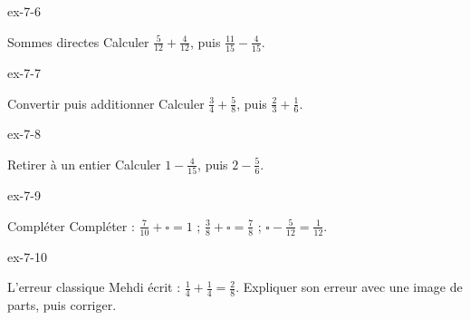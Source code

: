 \begin{blocLivre}{ex-7-6}\begin{exercice}[2]{Sommes directes}
Calculer $\frac5{12}+\frac4{12}$, puis $\frac{11}{15}-\frac4{15}$.
\end{exercice}\end{blocLivre}
\begin{blocLivre}{ex-7-7}\begin{exercice}[2]{Convertir puis additionner}
Calculer $\frac34+\frac58$, puis $\frac23+\frac16$.
\end{exercice}\end{blocLivre}
\begin{blocLivre}{ex-7-8}\begin{exercice}[2]{Retirer à un entier}
Calculer $1-\frac4{15}$, puis $2-\frac56$.
\end{exercice}\end{blocLivre}
\begin{blocLivre}{ex-7-9}\begin{exercice}[2]{Compléter}
Compléter : $\frac7{10}+\square=1$ ; $\frac38+\square=\frac78$ ; $\square-\frac5{12}=\frac1{12}$.
\end{exercice}\end{blocLivre}
\begin{blocLivre}{ex-7-10}\begin{exercice}[2]{L’erreur classique}
Mehdi écrit : $\frac14+\frac14=\frac28$. Expliquer son erreur avec une image de parts, puis corriger.
\end{exercice}\end{blocLivre}

